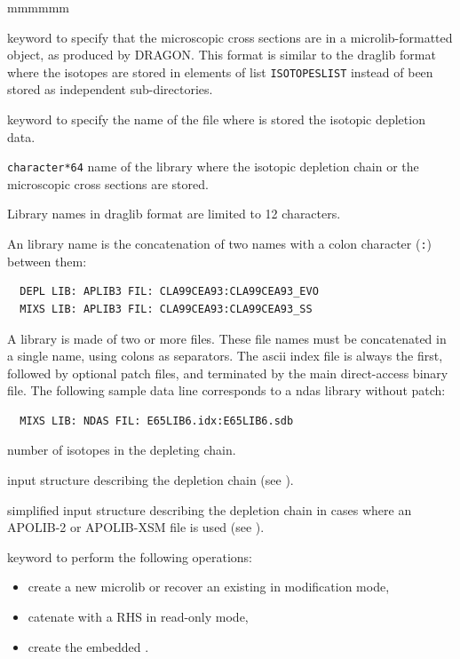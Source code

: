 \begin{ListeDeDescription}{mmmmmm}
\item[\moc{MICROLIB}] keyword to specify that the microscopic cross sections are
in a {\sc microlib}-formatted object, as produced by DRAGON. This format is similar to the {\sc draglib}
format where the isotopes are stored in elements of list {\tt ISOTOPESLIST} instead of been stored
as independent sub-directories.

\item[\moc{FIL:}] keyword to specify the name of the file where is stored the
isotopic depletion data. 

\item[\dusa{NAMEFIL}] {\tt character*64} name of the library
where the isotopic depletion chain or the microscopic cross sections are stored.

Library names in {\sc draglib} format are limited to 12 characters.

An  library name is the concatenation of two names with a colon character ({\tt :}) between them:
\begin{verbatim}
  DEPL LIB: APLIB3 FIL: CLA99CEA93:CLA99CEA93_EVO
  MIXS LIB: APLIB3 FIL: CLA99CEA93:CLA99CEA93_SS
\end{verbatim}

A  library is made of two or more files. These file names must be concatenated in a single
 name, using colons as separators. The {\sc ascii} index file is always the first,
followed by optional patch files, and terminated by the main direct-access binary file. The
following sample data line corresponds to a {\sc ndas} library without patch:
\begin{verbatim}
  MIXS LIB: NDAS FIL: E65LIB6.idx:E65LIB6.sdb
\end{verbatim}

\item[\dusa{ndepl}] number of isotopes in the depleting chain.

\item[\dstr{descdepl}] input structure describing the
depletion chain (see ).

\item[\dstr{descdeplA2}] simplified input structure describing the
depletion chain in cases where an APOLIB-2 or APOLIB-XSM file is used (see ).

\item[\moc{CATL}] keyword to perform the following operations:
\vspace{-0.15cm}
\begin{itemize}
\item create a new microlib or recover an existing  in modification mode,
\item catenate with a RHS  in read-only mode,
\item create the embedded  .
\end{itemize}


\end{ListeDeDescription}
